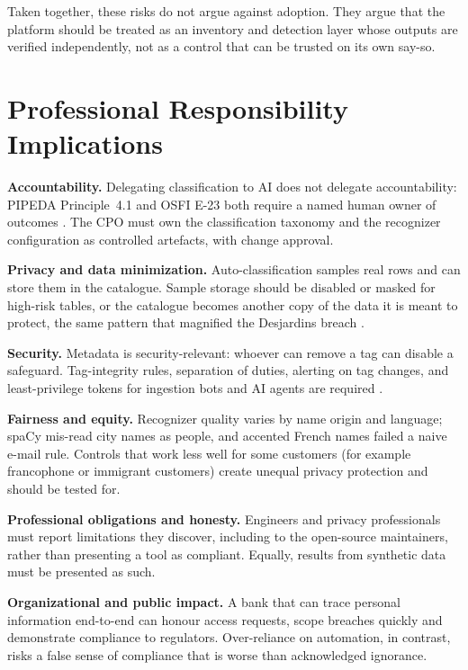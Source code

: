 \documentclass[journal,onecolumn,11pt]{IEEEtran}
\begin{document}
Taken together, these risks do not argue against adoption. They argue that the platform should be treated as an inventory and detection layer whose outputs are verified independently, not as a control that can be trusted on its own say-so.

\section{Professional Responsibility Implications}
\textbf{Accountability.} Delegating classification to AI does not delegate accountability: PIPEDA Principle~4.1 and OSFI E-23 both require a named human owner of outcomes \cite{pipeda,osfi_e23}. The CPO must own the classification taxonomy and the recognizer configuration as controlled artefacts, with change approval.

\textbf{Privacy and data minimization.} Auto-classification samples real rows and can store them in the catalogue. Sample storage should be disabled or masked for high-risk tables, or the catalogue becomes another copy of the data it is meant to protect, the same pattern that magnified the Desjardins breach \cite{opc_desjardins}.

\textbf{Security.} Metadata is security-relevant: whoever can remove a tag can disable a safeguard. Tag-integrity rules, separation of duties, alerting on tag changes, and least-privilege tokens for ingestion bots and AI agents are required \cite{osfi_b13,hou_mcp}.

\textbf{Fairness and equity.} Recognizer quality varies by name origin and language; spaCy mis-read city names as people, and accented French names failed a naive e-mail rule. Controls that work less well for some customers (for example francophone or immigrant customers) create unequal privacy protection and should be tested for.

\textbf{Professional obligations and honesty.} Engineers and privacy professionals must report limitations they discover, including to the open-source maintainers, rather than presenting a tool as compliant. Equally, results from synthetic data must be presented as such.

\textbf{Organizational and public impact.} A bank that can trace personal information end-to-end can honour access requests, scope breaches quickly and demonstrate compliance to regulators. Over-reliance on automation, in contrast, risks a false sense of compliance that is worse than acknowledged ignorance.
\end{document}
